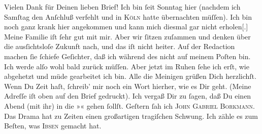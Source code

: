 \begin{ledgroupsized}[t]{13cm}
           Vielen Dank für Deinen lieben Brief!\pend
           \pstart
           Ich bin ſeit Sonntag hier (nachdem ich Samſtag den Anſchluß verfehlt und in \textsc{Köln} hatte übernachten müſſen). Ich bin noch ganz krank hier angekommen und kann
               mich diesmal gar nicht erholen{[}.{]} Meine Familie iſt ſehr gut mit
               mir. Aber wir ſitzen zuſammen und denken über die ausſichtsloſe Zukunft nach, und das
               iſt nicht heiter. Auf der Redaction machen ſie ſchiefe Geſichter, daß ich während des \label{K_L02809-1v}\label{K_L02809-1h} nicht auf meinem Poſten bin. Ich werde alſo wohl bald zurück {\pb}müſſen. Aber jetzt im Ruhen ſehe ich erſt, wie
               abgehetzt und müde gearbeitet ich bin.\pend
           \pstart
           Alle die Meinigen grüßen Dich herzlichſt.\pend
           \pstart
           Wenn Du Zeit haſt, ſchreib’ mir noch ein Wort hierher, wie es Dir geht. (Meine
               Adreſſe iſt oben auf den Brief gedruckt).\pend
           \pstart
           Ich vergaß Dir zu ſagen, daß Du einen Abend (mit ihr) in die »\label{K_L02809-45v}\label{K_L02809-45h}« gehen ſollſt.\pend
           \pstart
           Geſtern ſah ich \textsc{John Gabriel Borkmann}.  Das Drama hat zu Zeiten einen großartigen tragiſchen Schwung. Ich zähle es zum
               Beſten, was \strikeout{\textcolor{gray}{×}\-\textcolor{gray}{×}\-\textcolor{gray}{×}}{ }\textsc{Ibsen} gemacht hat.\pend

\end{ledgroupsized}
